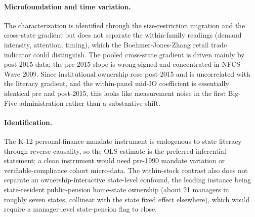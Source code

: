 \paragraph{Microfoundation and time variation.} The characterization is identified through the size-restriction migration and the cross-state gradient but does not separate the within-family readings (demand intensity, attention, timing), which the Boehmer-Jones-Zhang retail trade indicator could distinguish. The pooled cross-state gradient is driven mainly by post-2015 data; the pre-2015 slope is wrong-signed and concentrated in NFCS Wave 2009. Since institutional ownership rose post-2015 and is uncorrelated with the literacy gradient, and the within-panel mid-IO coefficient is essentially identical pre and post-2015, this looks like measurement noise in the first Big-Five administration rather than a substantive shift.

\paragraph{Identification.} The K-12 personal-finance mandate instrument is endogenous to state literacy through reverse causality, so the OLS estimate is the preferred inferential statement; a clean instrument would need pre-1990 mandate variation \citep{bernheimGarrettMaki2001} or verifiable-compliance cohort micro-data. The within-stock contrast also does not separate an ownership-interactive state-level confound, the leading instance being state-resident public-pension home-state ownership (about 21 managers in roughly seven states, collinear with the state fixed effect elsewhere), which would require a manager-level state-pension flag to close.
